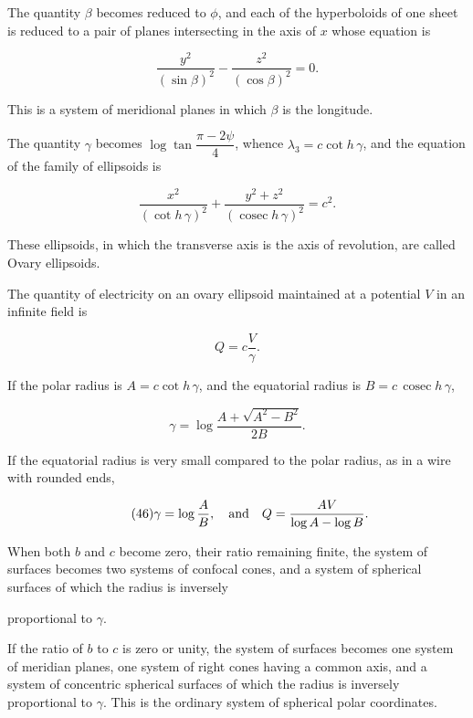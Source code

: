 \documentclass[11pt,a4paper]{article}
\begin{document}
The quantity $\beta$ becomes reduced to $\phi$, and each of the hyperboloids of one sheet is reduced to a pair of planes intersecting in the axis of $x$ whose equation is

\begin{equation}\tag{42}
\frac{y^2}{(\sin\beta)^2} - \frac{z^2}{(\cos\beta)^2} = 0.
\end{equation}

This is a system of meridional planes in which $\beta$ is the longitude.

The quantity $\gamma$ becomes $\log\tan\dfrac{\pi-2\psi}{4}$, whence $\lambda_3=c\cot h\,\gamma$, and the equation of the family of ellipsoids is

\begin{equation}\tag{43}
\frac{x^2}{(\cot h\,\gamma)^2}
+\frac{y^2+z^2}{(\operatorname{cosec}h\,\gamma)^2}=c^2.
\end{equation}

These ellipsoids, in which the transverse axis is the axis of revolution, are called Ovary ellipsoids.

The quantity of electricity on an ovary ellipsoid maintained at a potential $V$ in an infinite field is

\begin{equation}\tag{44}
Q=c\frac{V}{\gamma}.
\end{equation}

If the polar radius is $A=c\cot h\,\gamma$, and the equatorial radius is $B=c\,\operatorname{cosec}h\,\gamma$,

\begin{equation}\tag{45}
\gamma = \log \frac{A + \sqrt{A^2 - B^2}}{2B}.
\end{equation}

\setcounter{footnote}{0}
If the equatorial radius is very small compared to the polar radius, as in a wire with rounded ends,

\begin{equation}\tag{46}
\gamma=\log\frac{A}{B},\quad\hbox{and}\quad
Q=\frac{AV}{\log A-\log B}.
\end{equation}

When both $b$ and $c$ become zero, their ratio remaining finite, the system of surfaces becomes two systems of confocal cones, and a system of spherical surfaces of which the radius is inversely

proportional to $\gamma$.

If the ratio of $b$ to $c$ is zero or unity, the system of surfaces becomes one system of meridian planes, one system of right cones having a common axis, and a system of concentric spherical surfaces of which the radius is inversely proportional to $\gamma$. This is the ordinary system of spherical polar coordinates.
\end{document}
